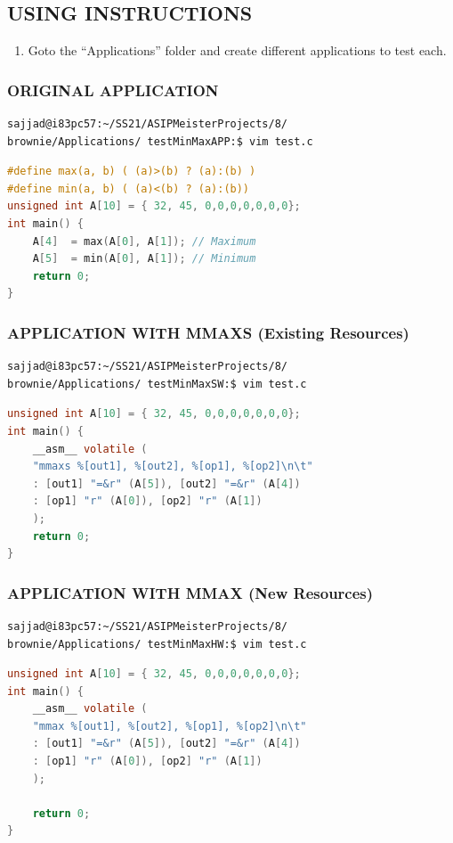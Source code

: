 \subsection{USING INSTRUCTIONS}
\begin{enumerate}[resume]
\item Goto the ``Applications'' folder and create different applications to
test each.
\end{enumerate}
\subsubsection{ORIGINAL APPLICATION}
\begin{lstlisting}
sajjad@i83pc57:~/SS21/ASIPMeisterProjects/8/
brownie/Applications/ testMinMaxAPP:$ vim test.c
\end{lstlisting}
\begin{lstlisting}[language=C,caption={"test.c using original"},captionpos=t]
#define max(a, b) ( (a)>(b) ? (a):(b) )
#define min(a, b) ( (a)<(b) ? (a):(b))
unsigned int A[10] = { 32, 45, 0,0,0,0,0,0,0};
int main() {
	A[4]  = max(A[0], A[1]); // Maximum
	A[5]  = min(A[0], A[1]); // Minimum
	return 0;
}
\end{lstlisting}
\subsubsection{APPLICATION WITH MMAXS (Existing Resources)}
\begin{lstlisting}
sajjad@i83pc57:~/SS21/ASIPMeisterProjects/8/
brownie/Applications/ testMinMaxSW:$ vim test.c
\end{lstlisting}
\begin{lstlisting}[language=C,caption={"test.c using existing resources"},captionpos=t]
unsigned int A[10] = { 32, 45, 0,0,0,0,0,0,0};
int main() {
	__asm__ volatile (
	"mmaxs %[out1], %[out2], %[op1], %[op2]\n\t"
	: [out1] "=&r" (A[5]), [out2] "=&r" (A[4])
	: [op1] "r" (A[0]), [op2] "r" (A[1])
	);
	return 0;
}	
\end{lstlisting}
\subsubsection{APPLICATION WITH MMAX (New Resources)}
\begin{lstlisting}
sajjad@i83pc57:~/SS21/ASIPMeisterProjects/8/
brownie/Applications/ testMinMaxHW:$ vim test.c
\end{lstlisting}
\begin{lstlisting}[language=C,caption={"test.c using added resources"},captionpos=t]
unsigned int A[10] = { 32, 45, 0,0,0,0,0,0,0};
int main() {
	__asm__ volatile (
	"mmax %[out1], %[out2], %[op1], %[op2]\n\t"
	: [out1] "=&r" (A[5]), [out2] "=&r" (A[4])
	: [op1] "r" (A[0]), [op2] "r" (A[1])
	);
	
	return 0;
}
\end{lstlisting}
